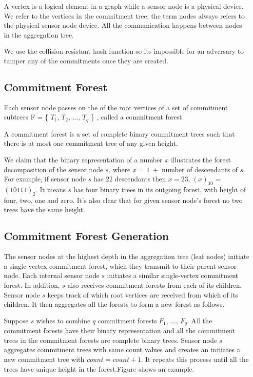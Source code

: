 	A vertex is a logical element in a graph while a sensor node is a physical device.
	We refer to the vertices in the commitment tree; the term nodes always refers to the physical	sensor node device.
	All the communication happens between nodes in the aggregation tree.
	
	We use the collision resistant hash function so its impossible for an adversary to tamper any of the commitments once they are created.

	\subsection{Commitment Forest}
		Each sensor node passes on the \payloads of the root vertices of a set of commitment subtrees F = \{ $T_{1}$, $T_{2}$, $\dotsc$, $T_{q}$ \} , called  a commitment forest.

		\begin{definition}\cite{chan2006secure}
		A commitment forest is a set of complete binary commitment trees such that there is at most one commitment tree of any given height.
		\end{definition}

		We claim that the binary representation of a number $x$ illustrates the forest decomposition of the sensor node $s$, where $x$ = $1\ +$ number of descendants of $s$.
		For example, if sensor node $s$ has $22$ descendants then $x =23$, $(x)_{10}$ = $(10111)_{2}$. 
		It means $s$ has four binary trees in its outgoing forest, with height of four, two, one and zero. It's also clear that for given sensor node's forest no two trees have the same height.

	\subsection{Commitment Forest Generation}
		The sensor nodes at the highest depth in the aggregation tree (leaf nodes) initiate a single-vertex commitment forest, which they transmit to their parent sensor node.
		Each internal sensor node $s$ initiates a similar single-vertex commitment forest.
		In addition, $s$ also receives commitment forests from each of its children.
		Sensor node $s$ keeps track of which root vertices are received from which of its children.
		It then aggregates all the forests to form a new forest as follows.
		
		Suppose $s$ wishes to combine $q$ commitment forests $F_{1}$, $\dotsc$, $F_{q}$.
		All the commitment forests have their binary representation and all the commitment trees in the commitment forests are complete binary trees. 
		Sensor node $s$ aggregates commitment trees with same count values and creates an initiates a new commitment tree with $count = count + 1$. It repeats this process until all the trees have unique height in the forest.Figure shows an example.

